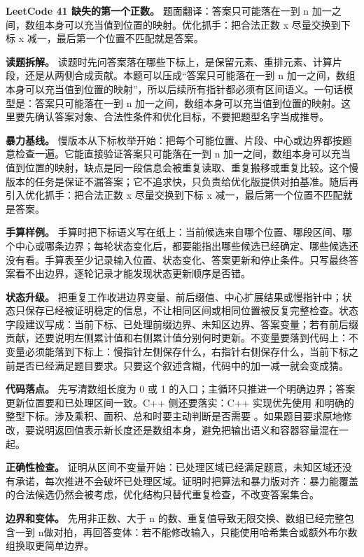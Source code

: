 \noindent\textbf{LeetCode 41 缺失的第一个正数。} 题面翻译：答案只可能落在一到 n 加一之间，数组本身可以充当值到位置的映射。优化抓手：把合法正数 x 尽量交换到下标 x 减一，最后第一个位置不匹配就是答案。

\textbf{读题拆解。} 读题时先问答案落在哪些下标上，是保留元素、重排元素、计算片段，还是从两侧合成贡献。本题可以压成“答案只可能落在一到 n 加一之间，数组本身可以充当值到位置的映射”，所以后续所有指针都必须有区间语义。一句话模型是：答案只可能落在一到 n 加一之间，数组本身可以充当值到位置的映射。这里要先确认答案对象、合法性条件和优化目标，不要把题型名字当成推导。

\textbf{暴力基线。} 慢版本从下标枚举开始：把每个可能位置、片段、中心或边界都按题意检查一遍。它能直接验证答案只可能落在一到 n 加一之间，数组本身可以充当值到位置的映射，缺点是同一段信息会被重复读取、重复搬移或重复比较。这个慢版本的任务是保证不漏答案；它不追求快，只负责给优化版提供对拍基准。随后再引入优化抓手：把合法正数 x 尽量交换到下标 x 减一，最后第一个位置不匹配就是答案。

\textbf{手算样例。} 手算时把下标语义写在纸上：当前候选来自哪个位置、哪段区间、哪个中心或哪条边界；每轮状态变化后，都要能指出哪些候选已经确定、哪些候选还没有看。手算表至少记录输入位置、状态变化、答案更新和停止条件。只写最终答案看不出边界，逐轮记录才能发现状态更新顺序是否错。

\textbf{状态升级。} 把重复工作收进边界变量、前后缀值、中心扩展结果或慢指针中；状态只保存已经被证明稳定的信息，不让相同区间或相同位置被反复完整检查。状态字段建议写成：当前下标、已处理前缀边界、未知区边界、答案变量；若有前后缀贡献，还要说明左侧累计值和右侧累计值分别何时更新。不变量要落到代码上：不变量必须能落到下标上：慢指针左侧保存什么，右指针右侧保存什么，当前下标之前是否已经满足题目要求。只要这个叙述含糊，代码中的加一减一就会变成猜。

\textbf{代码落点。} 先写清数组长度为 0 或 1 的入口；主循环只推进一个明确边界；答案更新位置要和已处理区间一致。C++ 侧还要落实：C++ 实现优先使用  和明确的整型下标。涉及乘积、面积、总和时要主动判断是否需要 。如果题目要求原地修改，要说明返回值表示新长度还是数组本身，避免把输出语义和容器容量混在一起。

\textbf{正确性检查。} 证明从区间不变量开始：已处理区域已经满足题意，未知区域还没有承诺，每次推进不会破坏已处理区域。证明时把算法和暴力版对齐：暴力能覆盖的合法候选仍然会被考虑，优化结构只替代重复检查，不改变答案集合。

\textbf{边界和变体。} 先用非正数、大于 n 的数、重复值导致无限交换、数组已经完整包含一到 n做对拍，再回答变体：若不能修改输入，只能使用哈希集合或额外布尔数组换取更简单边界。

